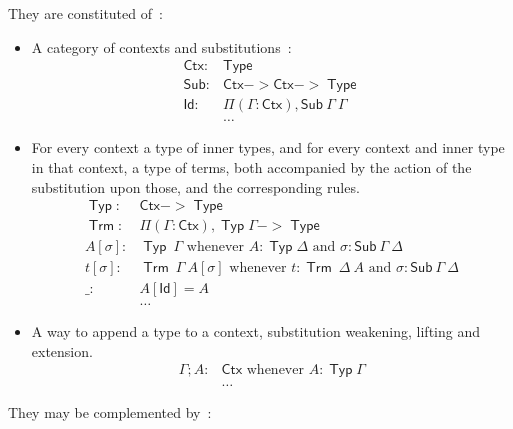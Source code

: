 \documentclass[11pt]{article}
\DeclareMathOperator{\Type}{\mathsf{Type}}
\DeclareMathOperator{\Typ}{\mathsf{Typ}}
\DeclareMathOperator{\Trm}{\mathsf{Trm}}
\newcommand{\0}{\mathbf{0}}
\newcommand{\1}{\mathbf{1}}
\begin{document}
They are constituted of~:
\begin{itemize}
    \item A category of contexts and substitutions~:
    $$ \begin{array}{rl}
        \mathsf{Ctx} :& \Type\\
        \mathsf{Sub} :& \mathsf{Ctx} -> \mathsf{Ctx} -> \Type\\
        \mathsf{Id} :& \Pi (\Gamma:\mathsf{Ctx}), \mathsf{Sub}\ \Gamma\ \Gamma\\
        &\dots
    \end{array}$$
    \item For every context a type of inner types, and for every context and inner type in that context, a type of terms, both accompanied by the action of the substitution upon those, and the corresponding rules.
    $$ \begin{array}{rl}
        \Typ :& \mathsf{Ctx} -> \Type\\
        \Trm :& \Pi (\Gamma : \mathsf{Ctx}),\Typ \Gamma -> \Type\\
        A[\sigma] :&\Typ\ \Gamma \text{ whenever } A : \Typ \Delta \text{ and } \sigma : \mathsf{Sub}\ \Gamma\  \Delta\\
        t[\sigma] :&\Trm\ \Gamma\ A[\sigma]\text{ whenever } t : \Trm\ \Delta\ A \text{ and } \sigma : \mathsf{Sub}\ \Gamma\  \Delta\\
        \_:& A[\mathsf{Id}] = A\\
        &\dots
    \end{array} $$
    \item A way to append a type to a context, substitution weakening, lifting and extension.
    $$ \begin{array}{rl}
        \Gamma ; A :& \mathsf{Ctx} \text{ whenever } A : \Typ \Gamma\\
        &\dots
    \end{array}$$
\end{itemize}
They may be complemented by~:
\end{document}
